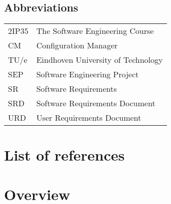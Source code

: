 \subsection{Abbreviations}
\begin{tabular}{l|l}
2IP35 & The Software Engineering Course \\
CM    &Configuration Manager \\
TU/e  &Eindhoven University of Technology \\
SEP   &Software Engineering Project \\
SR    &Software Requirements \\
SRD & Software Requirements Document \\
URD   &User Requirements Document \\
\end{tabular}

\section{List of references}





\section{Overview}






